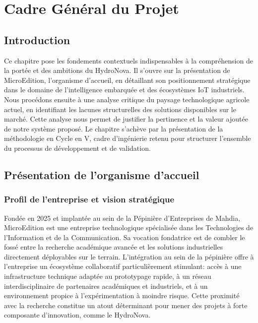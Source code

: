 \chapter{Cadre Général du Projet}
	
	\section*{Introduction}
	
Ce chapitre pose les fondements contextuels indispensables à la compréhension de la portée et des ambitions du HydroNova. Il s'ouvre sur la présentation de MicroEdition, l'organisme d'accueil, en détaillant son positionnement stratégique dans le domaine de l'intelligence embarquée et des écosystèmes IoT industriels. Nous procédons ensuite à une analyse critique du paysage technologique agricole actuel, en identifiant les lacunes structurelles des solutions disponibles sur le marché. Cette analyse nous permet de justifier la pertinence et la valeur ajoutée de notre système proposé. Le chapitre s'achève par la présentation de la méthodologie en Cycle en V, cadre d'ingénierie retenu pour structurer l'ensemble du processus de développement et de validation.
	
	\section{Présentation de l'organisme d'accueil}
	
	\subsection{Profil de l'entreprise et vision stratégique}
	
Fondée en 2025 et implantée au sein de la Pépinière d'Entreprises de Mahdia, MicroEdition est une entreprise technologique  spécialisée dans les Technologies de l'Information et de la Communication. Sa vocation fondatrice est de combler le fossé entre la recherche académique avancée et les solutions industrielles directement déployables sur le terrain.
L'intégration au sein de la pépinière offre à l'entreprise un écosystème collaboratif particulièrement stimulant: accès à une infrastructure technique adaptée au prototypage rapide, à un réseau interdisciplinaire de partenaires académiques et industriels, et à un environnement propice à l'expérimentation à moindre risque. Cette proximité avec la recherche constitue un atout déterminant pour mener des projets à forte composante d'innovation, comme le HydroNova.
	

